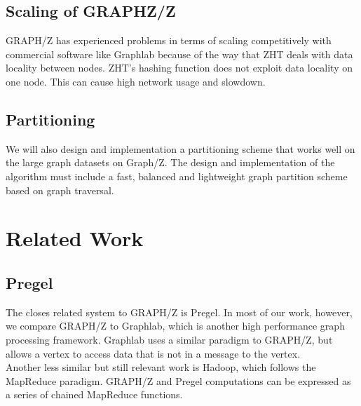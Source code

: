 \documentclass[10pt]{article}
\begin{document}
\begin{multicols}{2}
  \subsection{Scaling of GRAPHZ/Z}
  GRAPH/Z has experienced problems in terms of scaling competitively with commercial software like Graphlab because of the way that ZHT deals with data locality between nodes. ZHT's hashing function does not exploit data locality on one node.\cite{Gz:3} This can cause high network usage and slowdown.
  \subsection{Partitioning}
  We will also design and implementation a partitioning scheme that works well on the large graph datasets on Graph/Z. The design and implementation of the algorithm must include a fast, balanced and lightweight graph partition scheme based on graph traversal.
  \section{Related Work}
  \subsection{Pregel}
  The closes related system to GRAPH/Z is Pregel. In most of our work, however, we compare GRAPH/Z to Graphlab, which is another high performance graph processing framework. Graphlab uses a similar paradigm to GRAPH/Z, but allows a vertex to access data that is not in a message to the vertex.\cite{Gz:4} \\
  Another less similar but still relevant work is Hadoop, which follows the MapReduce paradigm. GRAPH/Z and Pregel computations can be expressed as a series of chained MapReduce functions.\cite{Gz:4}

\end{multicols}
\end{document}
